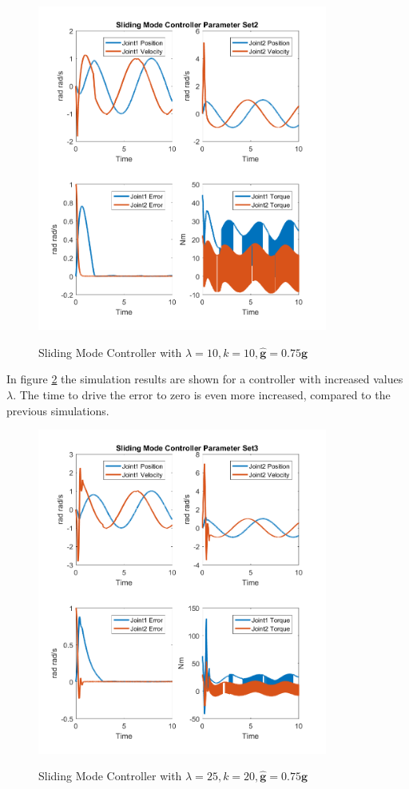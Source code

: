 \begin{figure}[]
	\centering
	\includegraphics[width=0.85\textwidth]{pics/SlidingModeControllerParameterSet2.png}\\
	\caption{Sliding Mode Controller with $\lambda = 10, k=10,\hat{\mathbf{g}}=0.75\mathbf{g}$  }
	\label{fig:ch5_smo2}
\end{figure}

In figure \ref{fig:ch5_smo3} the simulation results are shown for a controller with increased values $\lambda$. The time to drive the error to zero is even more increased, compared to the previous simulations.
\begin{figure}[]
	\centering
	\includegraphics[width=0.85\textwidth]{pics/SlidingModeControllerParameterSet3.png}\\
	\caption{Sliding Mode Controller with $\lambda = 25, k=20,\hat{\mathbf{g}}=0.75\mathbf{g}$  }
	\label{fig:ch5_smo3}
\end{figure}

